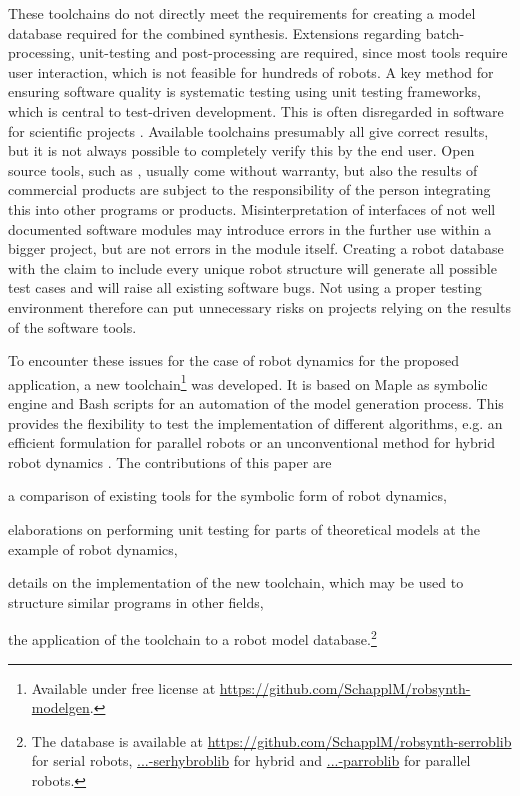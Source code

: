 \documentclass[runningheads]{llncs}
\begin{document}
These toolchains do not directly meet the requirements for creating a model database required for the combined synthesis.
Extensions regarding batch-pro\-ces\-sing, unit-testing and post-processing are required, since most tools require user interaction, which is not feasible for hundreds of robots.
A key method for ensuring software quality is systematic testing using unit testing frameworks, which is central to test-driven development. %
This is often disregarded in software for scientific projects \cite{WilsonAruBroHon2014}.
Available toolchains presumably all give correct results, but it is not always possible to completely verify this by the end user.
Open source tools, such as \cite{SousaCor2012,KhalilVijKhoMuk2014,BethgeMalTsaCal2017}, usually come without warranty, but also the results of commercial products are subject to the responsibility of the person integrating this into other programs or products.
Misinterpretation of interfaces of not well documented software modules may introduce errors in the further use within a bigger project, but are not errors in the module itself.
Creating a robot database with the claim to include every unique robot structure will generate all possible test cases and will raise all existing software bugs.
Not using a proper testing environment therefore can put unnecessary risks on projects relying on the results of the software tools.


To encounter these issues for the case of robot dynamics for the proposed application, a new toolchain\footnote{Available under free license at \url{https://github.com/SchapplM/robsynth-modelgen}.} was developed.
It is based on Maple as symbolic engine and Bash scripts for an automation of the model generation process.
This provides the flexibility to test the implementation of different algorithms, e.g. an efficient formulation for parallel robots \cite{AbdellatifHei2009} or an unconventional method for hybrid robot dynamics \cite{SchapplerLilHad2019}. %
The contributions of this paper are
\begin{compactitem}
\item a comparison of existing tools for the symbolic form of robot dynamics,
\item elaborations on performing unit testing for parts of theoretical models at the example of robot dynamics,
\item details on the implementation of the new toolchain, which may be used to structure similar programs in other fields,
\item the application of the toolchain to a robot model database.\footnote{The database is available at \url{https://github.com/SchapplM/robsynth-serroblib} for serial robots, \href{https://github.com/SchapplM/robsynth-serhybroblib}{...-serhybroblib} for hybrid and \href{https://github.com/SchapplM/robsynth-parroblib}{...-parroblib} for parallel robots.}
\end{compactitem}
\end{document}
